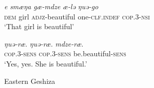 \begin{exe}
    \ex\label{e:Discussion:GeshizaDialogue2}
    \begin{xlist}
        \ex\label{e:Discussion:GeshizaDialogue2:A}
        \gll \textit{e} \textit{smæŋa} \textit{gæ-mdze} \textit{æ-lə} \textit{ŋuə-go} \\
        \textsc{dem} girl \textsc{adjz}-beautiful one-\textsc{clf.indef} \textsc{cop.3-nsi} \\
        \glt `That girl is beautiful'

        \ex\label{e:Discussion:GeshizaDialogue2:B}
        \gll \textit{ŋuə-ræ}. \textit{ŋuə-ræ}. \textit{mdze-ræ}. \\
        \textsc{cop.3-sens} \textsc{cop.3-sens} be.beautiful-\textsc{sens} \\
        \glt `Yes, yes. She is beautiful.'
    \end{xlist}
    Eastern Geshiza \cite[rGyalrongic: PRC,][593]{Honkasalo2019}
\end{exe}

